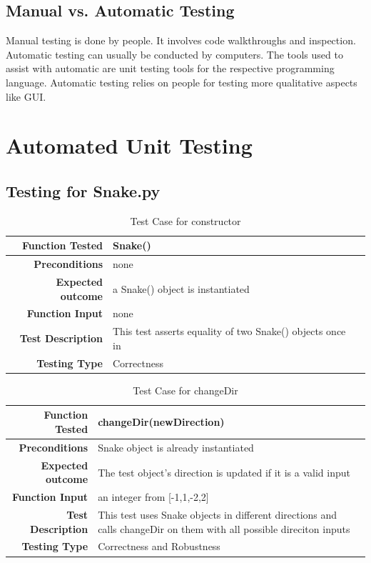 \documentclass[12pt]{article}
\begin{document}
\subsection{Manual vs. Automatic Testing}
Manual testing is done by people. It involves code walkthroughs and inspection. \newline\newline
Automatic testing can usually be conducted by computers. The tools used to assist with automatic are unit testing tools for the respective programming language. Automatic testing relies on people for testing more qualitative aspects like GUI. 


\section{Automated Unit Testing}
\subsection{Testing for Snake.py}
\begin{center}
	\begin{longtable}{ | r | p{4cm} | p{10cm} }
	\caption{Test Case for constructor} \\ \hline \label{TblInputVar} 
	\textbf{Function Tested} & Snake()\\ \hline
	\textbf{Preconditions} & none \\ \hline
	\textbf{Expected outcome} & a Snake() object is instantiated \\ \hline
	\textbf{Function Input} & none \\ \hline
	\textbf{Test Description} & This test asserts equality of two Snake() objects once in\\ \hline
	\textbf{Testing Type} & Correctness\\ \hline
	
	\end{longtable}
\end{center}

\begin{center}
	\begin{longtable}{ | r | p{4cm} | p{10cm} }
	\caption{Test Case for changeDir} \\ \hline \label{TblInputVar} 
	\textbf{Function Tested} & changeDir(newDirection)\\ \hline
	\textbf{Preconditions} & Snake object is already instantiated \\ \hline
	\textbf{Expected outcome} & The test object's direction is updated if it is a valid input \\ \hline
	\textbf{Function Input} & an integer from [-1,1,-2,2] \\ \hline
	\textbf{Test Description} & This test uses Snake objects in different directions and calls changeDir on them with all possible direciton inputs\\ \hline
	\textbf{Testing Type} & Correctness and Robustness\\ \hline
	
	\end{longtable}
\end{center}
\end{document}
